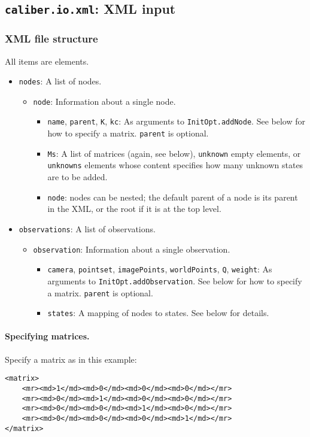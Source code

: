 \subsection{\texttt{caliber.io.xml}: XML input}
\subsubsection{XML file structure}
All items are elements.
\begin{itemize}
	\item \texttt{nodes}: A list of nodes.
	\begin{itemize}
		\item \texttt{node}: Information about a single node.
		\begin{itemize}
			\item \texttt{name}, \texttt{parent}, \texttt{K}, \texttt{kc}:
				As arguments to \texttt{InitOpt.addNode}. See below for how to specify a matrix.
				\texttt{parent} is optional.
			\item \texttt{Ms}: A list of matrices (again, see below), 
				\texttt{unknown} empty elements, or \texttt{unknowns} elements whose content
				specifies how many unknown states are to be added.
			\item \texttt{node}: nodes can be nested; the default parent of a node is 
				its parent in the XML, or the root if it is at the top level.
		\end{itemize}
	\end{itemize}
	\item \texttt{observations}: A list of observations.
	\begin{itemize}
		\item \texttt{observation}: Information about a single observation.
		\begin{itemize}
			\item \texttt{camera}, \texttt{pointset}, \texttt{imagePoints}, \texttt{worldPoints},
				\texttt{Q}, \texttt{weight}:
				As arguments to \texttt{InitOpt.addObservation}. See below for how to specify a matrix.
				\texttt{parent} is optional.
			\item \texttt{states}: A mapping of nodes to states. See below for details.
		\end{itemize}
	\end{itemize}
\end{itemize}

\paragraph{Specifying matrices.} Specify a matrix as in this example:
\begin{verbatim}
<matrix>
    <mr><md>1</md><md>0</md><md>0</md><md>0</md></mr>
    <mr><md>0</md><md>1</md><md>0</md><md>0</md></mr>
    <mr><md>0</md><md>0</md><md>1</md><md>0</md></mr>
    <mr><md>0</md><md>0</md><md>0</md><md>1</md></mr>
</matrix>
\end{verbatim}

